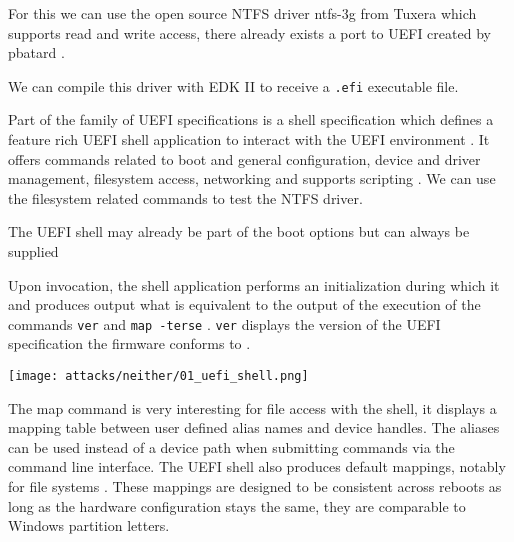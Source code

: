 For this we can use the open source NTFS driver ntfs-3g from Tuxera \cite{ntfs-3g} which supports read and write access, there already exists a port to UEFI created by pbatard \cite{ntfs-3g-uefi}.

We can compile this driver with EDK II to receive a \lstinline{.efi} executable file.

Part of the family of UEFI specifications is a shell specification which defines a feature rich UEFI shell application to interact with the UEFI environment \cite[1.1]{uefi-shell-spec}. It offers commands related to boot and general configuration, device and driver management, filesystem access, networking \cite[5.1]{uefi-shell-spec} and supports scripting \cite[4]{uefi-shell-spec}. We can use the filesystem related commands to test the NTFS driver.

The UEFI shell may already be part of the boot options but can always be supplied

Upon invocation, the shell application performs an initialization during which it  and produces output what is equivalent to the output of the execution of the commands \lstinline{ver} and \lstinline{map -terse} \cite[3.3 Initialization]{uefi-shell}. \lstinline{ver} displays the version of the UEFI specification the firmware conforms to \cite[5.3 Shell Commands]{uefi-shell}.

\texttt{[image: attacks/neither/01\_uefi\_shell.png]}


The map command is very interesting for file access with the shell, it displays a mapping table between user defined alias names and device handles. The aliases can be used instead of a device path when submitting commands via the command line interface. The UEFI shell also produces default mappings, notably for file systems \cite[3.7.2. Mappings]{uefi-shell}. These mappings are designed to be consistent across reboots as long as the hardware configuration stays the same, they are comparable to Windows partition letters. \cite[Appendix A]{uefi-shell}

